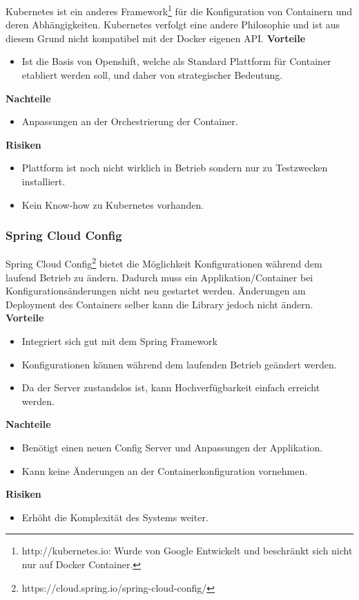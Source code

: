 Kubernetes ist ein anderes Framework\footnote{http://kubernetes.io: Wurde von Google Entwickelt und beschränkt sich nicht nur auf Docker Container.} für die Konfiguration von Containern und deren Abhängigkeiten. Kubernetes verfolgt eine andere Philosophie und ist aus diesem Grund nicht kompatibel mit der Docker eigenen API.
\newline
\newline
\textbf{Vorteile}
\begin{itemize}
	\item Ist die Basis von Openshift, welche als Standard Plattform für Container etabliert werden soll, und daher von strategischer Bedeutung.
\end{itemize}
\textbf{Nachteile}
\begin{itemize}
	\item Anpassungen an der Orchestrierung der Container.
\end{itemize}
\textbf{Risiken}
\begin{itemize}
	\item Plattform ist noch nicht wirklich in Betrieb sondern nur zu Testzwecken installiert.
	\item Kein Know-how zu Kubernetes vorhanden.
\end{itemize}

\subsubsection{Spring Cloud Config}

Spring Cloud Config\footnote{https://cloud.spring.io/spring-cloud-config/} bietet die Möglichkeit Konfigurationen während dem laufend Betrieb zu ändern. Dadurch muss ein Applikation/Container bei Konfigurationsänderungen nicht neu gestartet werden. Änderungen am Deployment des Containers selber kann die Library jedoch nicht ändern.\newline
\newline
\textbf{Vorteile}
\begin{itemize}
	\item Integriert sich gut mit dem Spring Framework
	\item Konfigurationen können während dem laufenden Betrieb geändert werden.
	\item Da der Server zustandslos ist, kann Hochverfügbarkeit einfach erreicht werden.
\end{itemize}
\textbf{Nachteile}
\begin{itemize}
	\item Benötigt einen neuen Config Server und Anpassungen der Applikation.
	\item Kann keine Änderungen an der Containerkonfiguration vornehmen.
\end{itemize}
\textbf{Risiken}
\begin{itemize}
	\item Erhöht die Komplexität des Systems weiter.
\end{itemize}

